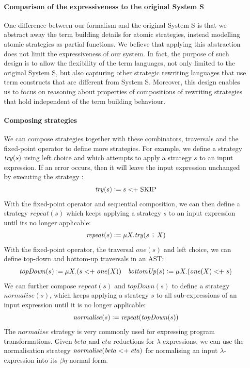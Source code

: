 \paragraph*{Comparison of the expressiveness to the original System S}One difference between our formalism and the original System S is that we abstract away the term building details for atomic strategies, instead modelling atomic strategies as partial functions. We believe that applying this abstraction does not limit the expressiveness of our system. In fact, the purpose of such design is to allow the flexibility of the term languages, not only limited to the original System S, but also capturing other strategic rewriting languages that use term constructs that are different from System S. Moreover, this design enables us to focus on reasoning about properties of compositions of rewriting strategies that hold independent of the term building behaviour.

\paragraph*{Composing strategies}We can compose strategies together with these combinators, traversals and the fixed-point operator to define more strategies. For example, we define a strategy $\text{\textit{try}}(s)$ using left choice and \sskip which attempts to apply a strategy $s$ to an input expression. If an error occurs, then it will leave the input expression unchanged by executing the strategy \sskip:
\[\text{\textit{try}}(s) \mathrel{\mathop:}= s <\mathrel{\mathop+} \text{SKIP}\]
With the fixed-point operator and sequential composition, we can then define a strategy $\mathit{repeat}(s)$ which keeps applying a strategy $s$ to an input expression until its no longer applicable:
\[\mathit{repeat}(s) \mathrel{\mathop:}= \mu X. \mathit{try}(s\, \mathrel{\mathop;} \, X)\]
With the fixed-point operator, the traversal $\mathit{one}(s)$ and left choice, we can define top-down and bottom-up traversals in an AST:
\begin{align*}
    &\mathit{topDown} (s) \mathrel{\mathop:}= \mu X. (s <\mathrel{\mathop+} \text{\textit{one}\/}(X))
    &\mathit{bottomUp} (s) \mathrel{\mathop:}= \mu X. (\text{\textit{one}\/}(X) <\mathrel{\mathop+} s)
\end{align*}
We can further compose $\mathit{repeat}(s)$ and $\mathit{topDown}(s)$ to define a strategy $\mathit{normalise}(s)$, which keeps applying a strategy $s$ to all sub-expressions of an input expression until it is no longer applicable:
\[\mathit{normalise} (s) \mathrel{\mathop:}= \mathit{repeat}(\mathit{topDown}(s))\]
The $\mathit{normalise}$ strategy is very commonly used for expressing program transformations. Given $\mathit{beta}$ and $\mathit{eta}$ reductions for $\lambda$-expressions, we can use the normalisation strategy $\mathit{normalise}(\mathit{beta} <\mathrel{\mathop+} \mathit{eta})$ for normalising an input $\lambda$-expression into its $\beta\eta$-normal form.

